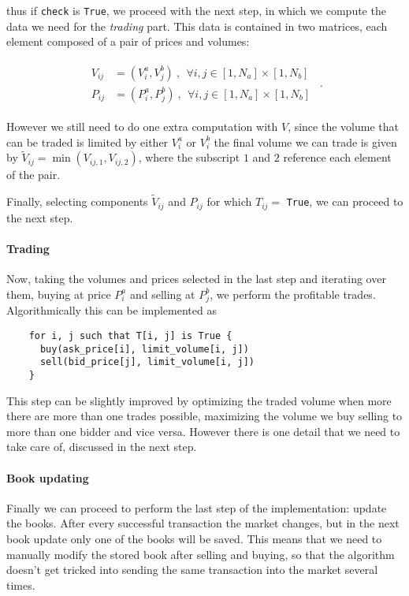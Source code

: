 \documentclass[8 pt]{article}
\begin{document}
\begin{multicols*}{2}
  thus if \texttt{check} is \texttt{True}, we proceed with the next step, in which we compute the data we need for the \emph{trading} part. This data is contained in two matrices, each element composed of a pair of prices and volumes:

  \begin{align*}
    \begin{split}
      V_{ij} &= ( V^a_i, V^b_j ) ~,~~ \forall i,j \in [1, N_a]\times[1, N_b] \\
      P_{ij} &= ( P^a_i, P^b_j ) ~,~~ \forall i,j \in [1, N_a]\times[1, N_b]
    \end{split}
    ~~.
  \end{align*}

  However we still need to do one extra computation with $V$, since the volume that can be traded is limited by either $V^a_i$ or $V^b_i$ the final volume we can trade is given by $\tilde V_{ij} = \min(V_{ij,1}, V_{ij, 2})$, where the subscript $1$ and $2$ reference each element of the pair.

  Finally, selecting components $\tilde V_{ij}$ and $P_{ij}$ for which $T_{ij} = $ \texttt{True}, we can proceed to the next step.

  \paragraph{Trading}

  Now, taking the volumes and prices selected in the last step and iterating over them, buying at price $P^a_i$ and selling at $P^b_j$, we perform the profitable trades. Algorithmically this can be implemented as

  \begin{verbatim}
    for i, j such that T[i, j] is True {
      buy(ask_price[i], limit_volume[i, j])
      sell(bid_price[j], limit_volume[i, j])
    }
  \end{verbatim}

  This step can be slightly improved by optimizing the traded volume when more there are more than one trades possible, maximizing the volume we buy selling to more than one bidder and vice versa. However there is one detail that we need to take care of, discussed in the next step.

  \paragraph{Book updating}

  Finally we can proceed to perform the last step of the implementation: update the books. After every successful transaction the market changes, but in the next book update only one of the books will be saved. This means that we need to manually modify the stored book after selling and buying, so that the algorithm doesn't get tricked into sending the same transaction into the market several times.


\end{multicols*}
\end{document}
